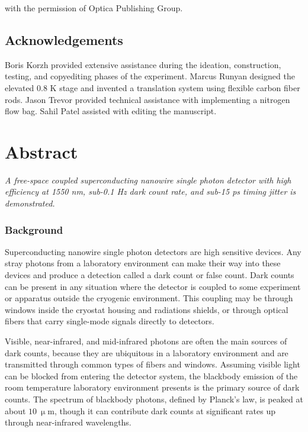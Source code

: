 \documentclass[11pt]{caltech_thesis} %
\begin{document}
with the permission of Optica Publishing Group.

\hypertarget{acknowledgements}{%
\subsection{Acknowledgements}\label{acknowledgements}}

Boris Korzh provided extensive assistance during the ideation, construction, testing, and copyediting phases of the experiment. Marcus Runyan designed the elevated 0.8 K stage and invented a translation system using flexible carbon fiber rods. Jason Trevor provided technical assistance with implementing a nitrogen flow bag. Sahil Patel assisted with editing the manuscript.

\hypertarget{abstract}{%
\section{Abstract}\label{abstract}}

\emph{A free-space coupled superconducting nanowire single photon detector with high efficiency at 1550 nm, sub-0.1 Hz dark count rate, and sub-15 ps timing jitter is demonstrated.}

\hypertarget{background}{%
\subsubsection{Background}\label{background}}

Superconducting nanowire single photon detectors are high sensitive devices. Any stray photons from a laboratory environment can make their way into these devices and produce a detection called a dark count or false count. Dark counts can be present in any situation where the detector is coupled to some experiment or apparatus outside the cryogenic environment. This coupling may be through windows inside the cryostat housing and radiations shields, or through optical fibers that carry single-mode signals directly to detectors.

Visible, near-infrared, and mid-infrared photons are often the main sources of dark counts, because they are ubiquitous in a laboratory environment and are transmitted through common types of fibers and windows. Assuming visible light can be blocked from entering the detector system, the blackbody emission of the room temperature laboratory environment presents is the primary source of dark counts. The spectrum of blackbody photons, defined by Planck's law, is peaked at about $10~\mathrm{\upmu m}$, though it can contribute dark counts at significant rates up through near-infrared wavelengths.
\end{document}
